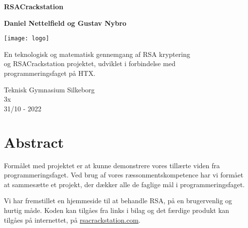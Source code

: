 \documentclass[a4paper,12pt]{extarticle}
\begin{document}
    \begin{titlepage}
        \begin{center}
            \vspace{1cm}

            \begin{huge}
                \textbf{RSACrackstation}
            \end{huge}

            \vspace{1cm}

            \textbf{Daniel Nettelfield og Gustav Nybro}

            \vspace{1.5cm}

            \noindent
            \texttt{[image: logo]}

            \vfill

            En teknologisk og matematisk gennemgang af RSA kryptering\\
            og RSACrackstation projektet, udviklet i forbindelse med\\
            programmeringsfaget på HTX.\@

            \vspace{0.8cm}

            Teknisk Gymnasium Silkeborg\\
            3x\\
            31/10 - 2022

        \end{center}
    \end{titlepage}

    \newpage

    \section*{Abstract}\label{sec:abstract}

    Formålet med projektet er at kunne demonstrere vores tillærte viden fra programmeringsfaget.
    Ved brug af vores ræssonmentskompetence har vi formået at sammesætte et projekt,
    der dækker alle de faglige mål i programmeringsfaget.
    
    Vi har fremstillet en hjemmeside til at behandle RSA, på en brugervenlig og hurtig måde.
    Koden kan tilgåes fra links i bilag og det færdige produkt kan tilgåes på internettet,
    på \href{https://rsacrackstation.com}{rsacrackstation.com}.

    \newpage
\end{document}
